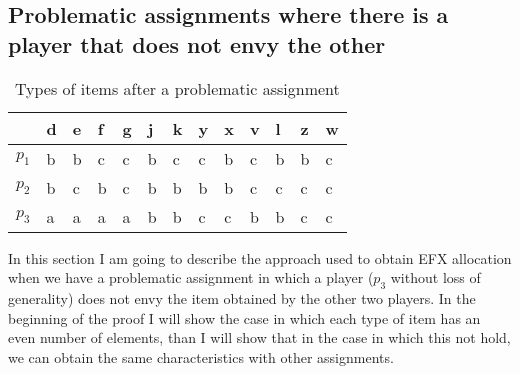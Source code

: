 \documentclass{article}
\begin{document}
\newpage
\newpage
\subsection{Problematic assignments where there is a player that does not envy the other}
\begin{table}[h]
\centering
\begin{tabular}{|l|l|l|l|l|l|l|l|l|l|l|l|l|}
\hline
      & d & e & f & g & j & k & y & x & v & l & z & w \\ \hline
$p_1$ & b & b & c & c & b & c & c & b & c & b & b & c \\ \hline
$p_2$ & b & c & b & c & b & b & b & b & c & c & c & c \\ \hline
$p_3$ & a & a & a & a & b & b & c & c & b & b & c & c \\ \hline
\end{tabular}
\caption{Types of items after a problematic assignment}
\end{table}
In this section I am going to describe the approach used to obtain EFX allocation when we have a problematic assignment in which a player ($p_3$ without loss of generality) does not envy the item obtained by the other two players. In the beginning of the proof I will show the case in which each type of item has an even number of elements, than I will show that in the case in which this not hold, we can obtain the same characteristics with other assignments. 
\end{document}
